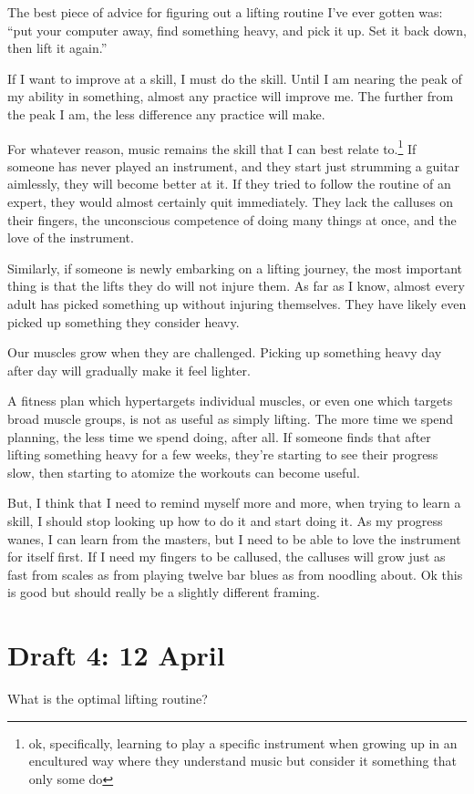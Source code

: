 \documentclass[12pt]{article}
\newcommand{\say}[1]{``#1''}
\renewcommand{\,}{\textsuperscript{,}}
\begin{document}
The best piece of advice for figuring out a lifting routine I've ever gotten was: \say{put your computer away, find something heavy, and pick it up.  
Set it back down, then lift it again.}

If I want to improve at a skill, I must do the skill.  
Until I am nearing the peak of my ability in something, almost any practice will improve me.  
The further from the peak I am, the less difference any practice will make.

For whatever reason, music remains the skill that I can best relate to.\footnote{ok, specifically, learning to play a specific instrument when growing up in an encultured way where they understand music but consider it something that only some do}  
If someone has never played an instrument, and they start just strumming a guitar aimlessly, they will become better at it.  
If they tried to follow the routine of an expert, they would almost certainly quit immediately.  
They lack the calluses on their fingers, the unconscious competence of doing many things at once, and the love of the instrument.

Similarly, if someone is newly embarking on a lifting journey, the most important thing is that the lifts they do will not injure them.  
As far as I know, almost every adult has picked something up without injuring themselves.  
They have likely even picked up something they consider heavy.

Our muscles grow when they are challenged.  
Picking up something heavy day after day will gradually make it feel lighter.

A fitness plan which hypertargets individual muscles, or even one which targets broad muscle groups, is not as useful as simply lifting.  
The more time we spend planning, the less time we spend doing, after all.  
If someone finds that after lifting something heavy for a few weeks, they're starting to see their progress slow, then starting to atomize the workouts can become useful.

But, I think that I need to remind myself more and more, when trying to learn a skill, I should stop looking up how to do it and start doing it.  
As my progress wanes, I can learn from the masters, but I need to be able to love the instrument for itself first.  
If I need my fingers to be callused, the calluses will grow just as fast from scales as from playing twelve bar blues as from noodling about.  
Ok this is good but should really be a slightly different framing.

\section{Draft 4: 12 April}  
What is the optimal lifting routine?
\end{document}
